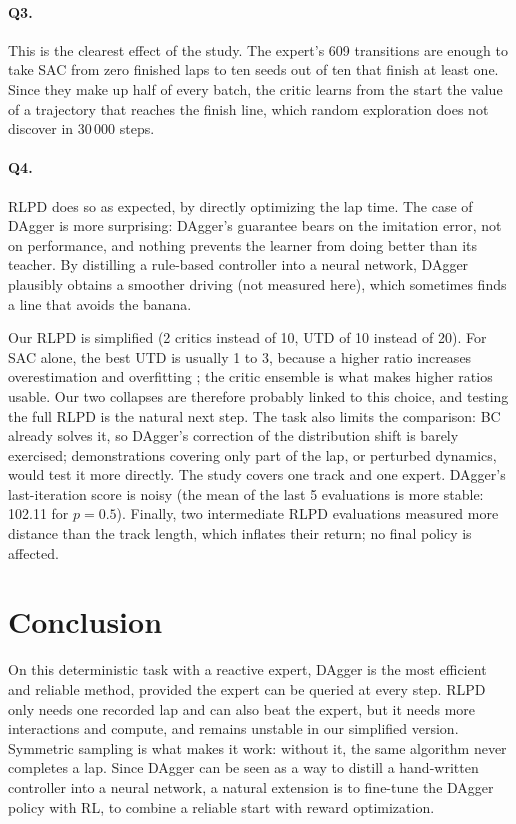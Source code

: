 \documentclass[10pt,a4paper,english]{article}
\begin{document}
\paragraph{Q3.} This is the clearest effect of the study. The expert's 609 transitions are enough to take SAC from zero finished laps to ten seeds out of ten that finish at least one. Since they make up half of every batch, the critic learns from the start the value of a trajectory that reaches the finish line, which random exploration does not discover in 30\,000 steps.

\paragraph{Q4.} RLPD does so as expected, by directly optimizing the lap time. The case of DAgger is more surprising: DAgger's guarantee bears on the imitation error, not on performance, and nothing prevents the learner from doing better than its teacher. By distilling a rule-based controller into a neural network, DAgger plausibly obtains a smoother driving (not measured here), which sometimes finds a line that avoids the banana.

Our RLPD is simplified (2 critics instead of 10, UTD of 10 instead of 20). For SAC alone, the best UTD is usually 1 to 3, because a higher ratio increases overestimation and overfitting \citep{li2023overfitting}; the critic ensemble is what makes higher ratios usable. Our two collapses are therefore probably linked to this choice, and testing the full RLPD is the natural next step. The task also limits the comparison: BC already solves it, so DAgger's correction of the distribution shift is barely exercised; demonstrations covering only part of the lap, or perturbed dynamics, would test it more directly. The study covers one track and one expert. DAgger's last-iteration score is noisy (the mean of the last 5 evaluations is more stable: 102.11 for $p = 0.5$). Finally, two intermediate RLPD evaluations measured more distance than the track length, which inflates their return; no final policy is affected.

\section{Conclusion}
\label{sec-conclusion}

On this deterministic task with a reactive expert, DAgger is the most efficient and reliable method, provided the expert can be queried at every step. RLPD only needs one recorded lap and can also beat the expert, but it needs more interactions and compute, and remains unstable in our simplified version. Symmetric sampling is what makes it work: without it, the same algorithm never completes a lap. Since DAgger can be seen as a way to distill a hand-written controller into a neural network, a natural extension is to fine-tune the DAgger policy with RL, to combine a reliable start with reward optimization.

\renewcommand{\bibfont}{\small}
\setlength{\bibsep}{1pt}


\end{document}
